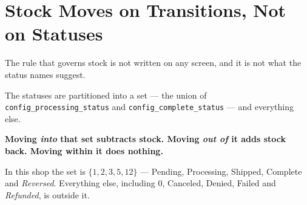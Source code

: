 \section{Stock Moves on Transitions, Not on Statuses}

The rule that governs stock is not written on any screen, and it is not what
the status names suggest.

\begin{definitionbox}
The statuses are partitioned into a set --- the union of
\texttt{config\_processing\_status} and \texttt{config\_complete\_status} ---
and everything else.

\smallskip
\textbf{Moving \emph{into} that set subtracts stock. Moving \emph{out of} it
adds stock back. Moving within it does nothing.}

\smallskip
In this shop the set is $\{1, 2, 3, 5, 12\}$ --- Pending, Processing, Shipped,
Complete and \emph{Reversed}. Everything else, including 0, Canceled, Denied,
Failed and \emph{Refunded}, is outside it.
\end{definitionbox}

